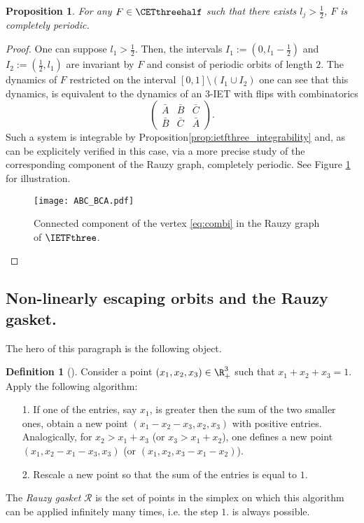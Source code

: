 \documentclass[12pt]{article}
\newtheorem{proposition}{Proposition}
\theoremstyle{definition}
\newtheorem{definition}{Definition}
\begin{document}
\begin{proposition}\label{prop:obtuse}
For any $F \in \CETthreehalf$ such that there exists $l_j>\frac{1}{2}$, $F$ is completely periodic.
\end{proposition}
\begin{proof}
One can suppose $l_1>\frac{1}{2}$. Then, the intervals $I_1:=(0, l_1-\frac{1}{2})$ and $I_2:=(\frac{1}{2}, l_1)$ are invariant by $F$ and consist of periodic orbits of length $2$. The dynamics of $F$ restricted on the interval $[0,1]\setminus \left( I_1 \cup I_2 \right) $ one can see that this dynamics, is equivalent to the dynamics of an $3$-IET with flips with combinatorics 
\begin{equation}\label{eq:combi}
\begin{pmatrix}
\bar{A}&\bar{B}&\bar{C}\\
\bar{B}&\bar{C}&\bar{A}
\end{pmatrix}.
\end{equation}
Such a system is integrable by Proposition\ref{prop:ietfthree_integrability} and, as can be explicitely verified in this case, via a more precise study of the corresponding component of the Rauzy graph, completely periodic. See Figure \ref{fig:component_ABC_BCA} for illustration.

\begin{figure}
\centering
\texttt{[image: ABC\_BCA.pdf]}
\caption{Connected component of the vertex \eqref{eq:combi} in the Rauzy graph of $\IETFthree$. }\label{fig:component_ABC_BCA}
\end{figure}
\end{proof}

\subsection{Non-linearly escaping orbits and the Rauzy gasket.}
The hero of this paragraph is the following object. 

\begin{definition}[\cite{AS13}]\label{defn:Rauzy_gasket}
Consider a point $(x_1, x_2, x_3) \in \R^3_+$ such that $x_1+x_2+x_3=1$. Apply the following algorithm: 
\begin{itemize}
\item[1.] If one of the entries, say $x_1$, is greater then the sum of the two smaller ones, obtain a new point $(x_1-x_2-x_3, x_2, x_3)$ with positive entries. Analogically, for $x_2>x_1+x_3 $ (or $x_3>x_1+x_2$), one defines a new point $(x_1,x_2-x_1-x_3,x_3)$ (or $(x_1,x_2,x_3-x_1-x_2)$).
\item[2.] Rescale a new point so that the sum of the entries is equal to $1$.
\end{itemize}
The \emph{Rauzy gasket} $\boldsymbol{\mathcal{R}}$ is the set of points in the simplex on which this algorithm can be applied infinitely many times, i.e. the step $1.$ is always possible.
\end{definition}
\end{document}
